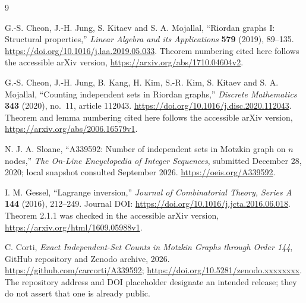 \documentclass[11pt,a4paper]{article}
\begin{document}
\clearpage
\begin{thebibliography}{9}
\sloppy\raggedright
{}
G.-S. Cheon, J.-H. Jung, S. Kitaev and S. A. Mojallal,
``Riordan graphs I: Structural properties,''
\emph{Linear Algebra and its Applications} \textbf{579} (2019), 89--135.
\url{https://doi.org/10.1016/j.laa.2019.05.033}.
Theorem numbering cited here follows the accessible arXiv version,
\url{https://arxiv.org/abs/1710.04604v2}.

G.-S. Cheon, J.-H. Jung, B. Kang, H. Kim, S.-R. Kim,
S. Kitaev and S. A. Mojallal,
``Counting independent sets in Riordan graphs,''
\emph{Discrete Mathematics} \textbf{343} (2020), no.~11, article 112043.
\url{https://doi.org/10.1016/j.disc.2020.112043}.
Theorem and lemma numbering cited here follows the accessible arXiv version,
\url{https://arxiv.org/abs/2006.16579v1}.

N. J. A. Sloane, ``A339592: Number of independent sets in Motzkin graph
on $n$ nodes,'' \emph{The On-Line Encyclopedia of Integer Sequences},
submitted December 28, 2020; local snapshot consulted September 2026.
\url{https://oeis.org/A339592}.

I. M. Gessel, ``Lagrange inversion,'' \emph{Journal of Combinatorial
Theory, Series A} \textbf{144} (2016), 212--249.
Journal DOI: \url{https://doi.org/10.1016/j.jcta.2016.06.018}.
Theorem 2.1.1 was checked in the accessible arXiv version,
\url{https://arxiv.org/html/1609.05988v1}.

C. Corti, \emph{Exact Independent-Set Counts in Motzkin Graphs through
Order 144}, GitHub repository and Zenodo archive, 2026.
\url{https://github.com/carcorti/A339592};
\url{https://doi.org/10.5281/zenodo.xxxxxxxx}.
The repository address and DOI placeholder designate an intended release;
they do not assert that one is already public.
\end{thebibliography}
\end{document}
